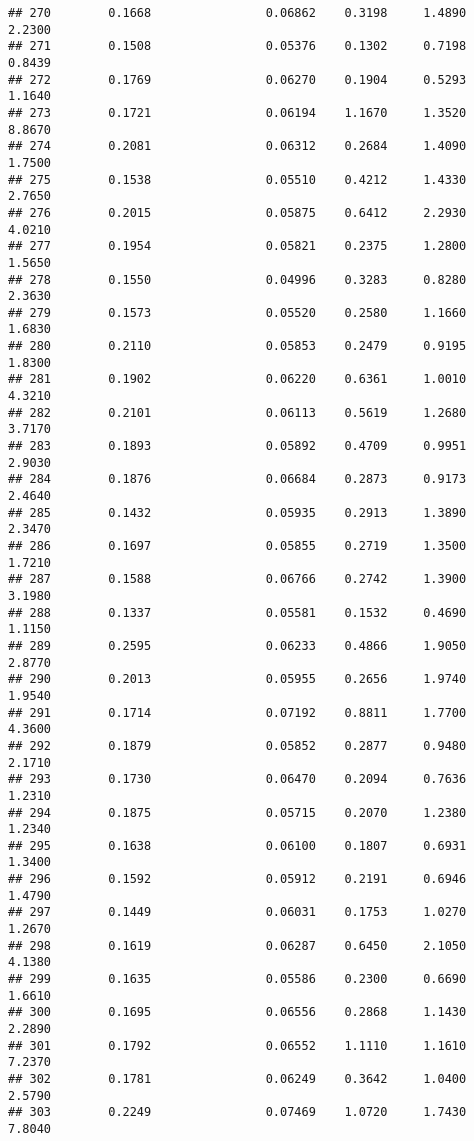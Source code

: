 \documentclass[
]{article}
\begin{document}
\begin{verbatim}
## 270        0.1668                0.06862    0.3198     1.4890       2.2300
## 271        0.1508                0.05376    0.1302     0.7198       0.8439
## 272        0.1769                0.06270    0.1904     0.5293       1.1640
## 273        0.1721                0.06194    1.1670     1.3520       8.8670
## 274        0.2081                0.06312    0.2684     1.4090       1.7500
## 275        0.1538                0.05510    0.4212     1.4330       2.7650
## 276        0.2015                0.05875    0.6412     2.2930       4.0210
## 277        0.1954                0.05821    0.2375     1.2800       1.5650
## 278        0.1550                0.04996    0.3283     0.8280       2.3630
## 279        0.1573                0.05520    0.2580     1.1660       1.6830
## 280        0.2110                0.05853    0.2479     0.9195       1.8300
## 281        0.1902                0.06220    0.6361     1.0010       4.3210
## 282        0.2101                0.06113    0.5619     1.2680       3.7170
## 283        0.1893                0.05892    0.4709     0.9951       2.9030
## 284        0.1876                0.06684    0.2873     0.9173       2.4640
## 285        0.1432                0.05935    0.2913     1.3890       2.3470
## 286        0.1697                0.05855    0.2719     1.3500       1.7210
## 287        0.1588                0.06766    0.2742     1.3900       3.1980
## 288        0.1337                0.05581    0.1532     0.4690       1.1150
## 289        0.2595                0.06233    0.4866     1.9050       2.8770
## 290        0.2013                0.05955    0.2656     1.9740       1.9540
## 291        0.1714                0.07192    0.8811     1.7700       4.3600
## 292        0.1879                0.05852    0.2877     0.9480       2.1710
## 293        0.1730                0.06470    0.2094     0.7636       1.2310
## 294        0.1875                0.05715    0.2070     1.2380       1.2340
## 295        0.1638                0.06100    0.1807     0.6931       1.3400
## 296        0.1592                0.05912    0.2191     0.6946       1.4790
## 297        0.1449                0.06031    0.1753     1.0270       1.2670
## 298        0.1619                0.06287    0.6450     2.1050       4.1380
## 299        0.1635                0.05586    0.2300     0.6690       1.6610
## 300        0.1695                0.06556    0.2868     1.1430       2.2890
## 301        0.1792                0.06552    1.1110     1.1610       7.2370
## 302        0.1781                0.06249    0.3642     1.0400       2.5790
## 303        0.2249                0.07469    1.0720     1.7430       7.8040

\end{verbatim}
\end{document}
